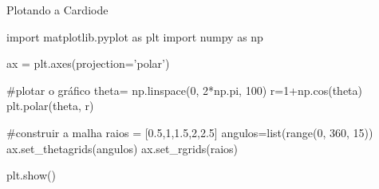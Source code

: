 \begin{frame}[label=polar,fragile=singleslide]{Plotando a Cardiode}
\begin{block}{}
\begin{small}
\begin{pyverbatim}
import matplotlib.pyplot as plt
import numpy as np

ax = plt.axes(projection='polar')

#plotar o gráfico
theta= np.linspace(0, 2*np.pi, 100)
r=1+np.cos(theta)
plt.polar(theta, r)

#construir a malha
raios = [0.5,1,1.5,2,2.5]
angulos=list(range(0, 360, 15))
ax.set_thetagrids(angulos) 
ax.set_rgrids(raios)

plt.show()
\end{pyverbatim}
\end{small}
\end{block}


\end{frame}

